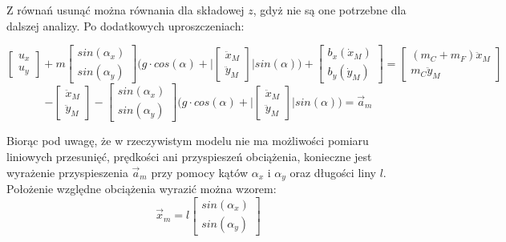 \documentclass[10pt]{article}
\begin{document}
Z równań usunąć można równania dla składowej $z$, gdyż nie są one potrzebne dla dalszej analizy. Po dodatkowych uproszczeniach:

\begin{equation}
\begin{bmatrix} u_x \\ u_y \end{bmatrix} + 
m \begin{bmatrix} sin(\alpha_x) \\ sin(\alpha_y) \end{bmatrix}
\Bigg( g \cdot cos(\alpha) + \Bigg| \begin{bmatrix} \ddot{x}_M \\ \ddot{y}_M \end{bmatrix} \Bigg| sin(\alpha) \Bigg) + 
\begin{bmatrix} b_x(\dot{x}_M) \\ b_y(\dot{y}_M) \end{bmatrix} = 
\begin{bmatrix}(m_C + m_F) \ddot{x}_M \\ m_C \ddot{y}_M \end{bmatrix}
\end{equation}
\begin{equation}
 - \begin{bmatrix} \ddot{x}_M \\ \ddot{y}_M \end{bmatrix} - 
\begin{bmatrix} sin(\alpha_x) \\ sin(\alpha_y) \end{bmatrix}
\Bigg( g \cdot cos(\alpha) + \Bigg| \begin{bmatrix} \ddot{x}_M \\ \ddot{y}_M \end{bmatrix} \Bigg| sin(\alpha) \Bigg)
 = \vec{a}_m
\end{equation}

Biorąc pod uwagę, że w rzeczywistym modelu nie ma możliwości pomiaru liniowych przesunięć, prędkości ani przyspieszeń obciążenia, konieczne jest wyrażenie przyspieszenia $\vec{a}_m$ przy pomocy kątów $\alpha_x$ i $\alpha_y$ oraz długości liny $l$. Położenie względne obciążenia wyrazić można wzorem:
\begin{equation}
\vec{x}_m = l \begin{bmatrix} sin(\alpha_x) \\ sin(\alpha_y) \end{bmatrix}
\end{equation}
\end{document}
